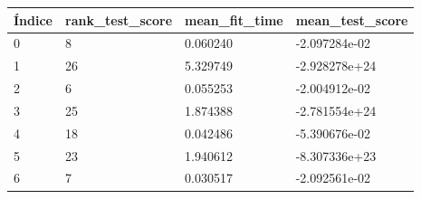 \documentclass[a4paper,11pt]{article}
\begin{document}
\begin{table}[h]
\begin{tabular}{|l|l|l|l|}
\hline
Índice      & rank\_test\_score & mean\_fit\_time   & mean\_test\_score      \\ \hline
0           & 8                 & 0.060240          & -2.097284e-02          \\ \hline
1           & 26                & 5.329749          & -2.928278e+24          \\ \hline
2           & 6                 & 0.055253          & -2.004912e-02          \\ \hline
3           & 25                & 1.874388          & -2.781554e+24          \\ \hline
4           & 18                & 0.042486          & -5.390676e-02          \\ \hline
5           & 23                & 1.940612          & -8.307336e+23          \\ \hline
6           & 7                 & 0.030517          & -2.092561e-02          \\ \hline
\end{tabular}
\end{table}
\newpage
\end{document}
